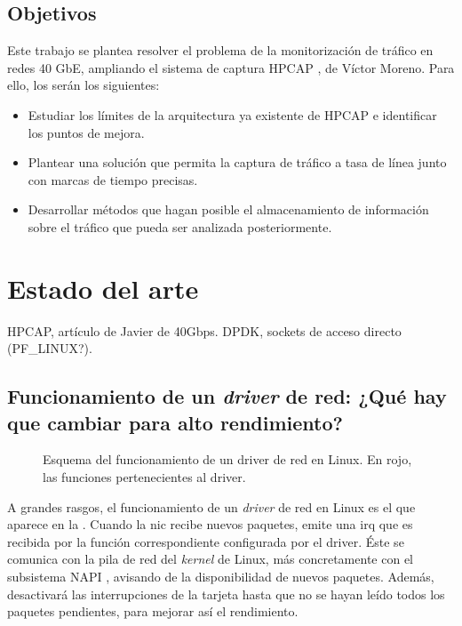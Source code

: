 \documentclass[oneside, draft]{epstfg}
\begin{document}
\section{Objetivos}

Este trabajo se plantea resolver el problema de la monitorización de tráfico en redes 40 GbE, ampliando el sistema de captura HPCAP \cite{MorenoTFM2012}, de Víctor Moreno. Para ello, los  serán los siguientes:

\begin{itemize}
\item Estudiar los límites de la arquitectura ya existente de HPCAP e identificar los puntos de mejora.
\item Plantear una solución que permita la captura de tráfico a tasa de línea junto con marcas de tiempo precisas.
\item Desarrollar métodos que hagan posible el almacenamiento de información sobre el tráfico que pueda ser analizada posteriormente.
\end{itemize}

\chapter{Estado del arte}

HPCAP, artículo de Javier de 40Gbps. DPDK, sockets de acceso directo (PF\_LINUX?).

\section{Funcionamiento de un \textit{driver} de red: ¿Qué hay que cambiar para alto rendimiento?}
\label{sec:EstadoArte:Funcionamiento}

\begin{figure}[hbtp]
\centering

\caption[Funcionamiento de un \textit{driver} de red en Linux]{Esquema del funcionamiento de un \gls{driver} de red en Linux. En rojo, las funciones pertenecientes al \gls{driver}.}
\label{fig:LinuxNetworkStack}
\end{figure}

A grandes rasgos, el funcionamiento de un \textit{\gls{driver}} de red en Linux es el que aparece en la . Cuando la \gls{nic} recibe nuevos paquetes, emite una \gls{irq} que es recibida por la función correspondiente configurada por el \gls{driver}. Éste se comunica con la pila de red del \textit{kernel} de Linux, más concretamente con el subsistema \gls{NAPI} \cite{NAPI}, avisando de la disponibilidad de nuevos paquetes. Además, desactivará las interrupciones de la tarjeta hasta que no se hayan leído todos los paquetes pendientes, para mejorar así el rendimiento.
\end{document}
